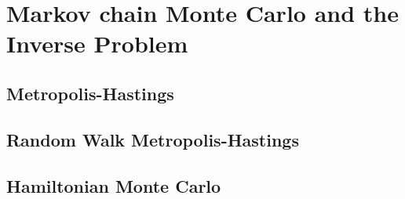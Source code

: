 \chapter{Markov chain Monte Carlo and the Inverse Problem}
\section{Metropolis-Hastings}
\section{Random Walk Metropolis-Hastings}
\section{Hamiltonian Monte Carlo}
